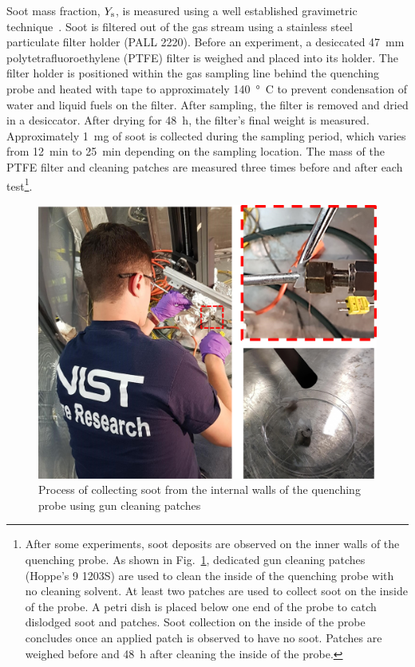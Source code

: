 \documentclass[12pt]{article}
\begin{document}
Soot mass fraction, $Y_{\rm s}$, is measured using a well established gravimetric technique~\cite{Choi1995}. Soot is filtered out of the gas stream using a stainless steel particulate filter holder (PALL 2220). Before an experiment, a desiccated \SI{47}{mm} polytetrafluoroethylene (PTFE) filter is weighed and placed into its holder. The filter holder is positioned within the gas sampling line behind the quenching probe and heated with tape to approximately \SI{140}{\degree C} to prevent condensation of water and liquid fuels on the filter. After sampling, the filter is removed and dried in a desiccator. After drying for 48~h, the filter’s final weight is measured. Approximately \SI{1}{mg} of soot is collected during the sampling period, which varies from 12~min to 25~min depending on the sampling location. The mass of the PTFE filter and cleaning patches are measured three times before and after each test\footnote{After some experiments, soot deposits are observed on the inner walls of the quenching probe. As shown in Fig.~\ref{fig:Soot_Probe_Setup}, dedicated gun cleaning patches (Hoppe's 9 1203S) are used to clean the inside of the quenching probe with no cleaning solvent. At least two patches are used to collect soot on the inside of the probe. A petri dish is placed below one end of the probe to catch dislodged soot and patches. Soot collection on the inside of the probe concludes once an applied patch is observed to have no soot. Patches are weighed before and 48~h after cleaning the inside of the probe.}.

\begin{figure}[ht!]
	\centering
\includegraphics[width=15.0cm,keepaspectratio]{Soot_Probe.png}
	\caption[Process for cleaning soot probe]{Process of collecting soot from the internal walls of the quenching probe using gun cleaning patches}
	\label{fig:Soot_Probe_Setup}
\end{figure}
\end{document}
